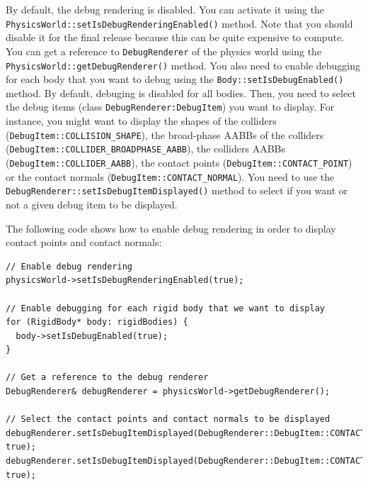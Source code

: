 \documentclass[a4paper,12pt]{article}
\begin{document}
  \begin{sloppypar}
   By default, the debug rendering is disabled. You can activate it using the \texttt{PhysicsWorld::setIsDebugRenderingEnabled()} method. Note that you
   should disable it for the final release because this can be quite expensive to compute. You can get a reference to \texttt{DebugRenderer} of the physics
   world using the \texttt{PhysicsWorld::getDebugRenderer()} method. You also need to enable debugging for each body that you want to debug using the
   \texttt{Body::setIsDebugEnabled()} method. By default,
   debuging is disabled for all bodies. Then, you need to select the debug items
   (class \texttt{DebugRenderer:DebugItem}) you want to display. For instance, you might want to display the shapes of the colliders
   (\texttt{DebugItem::COLLISION\_SHAPE}), the broad-phase AABBs of the colliders (\texttt{DebugItem::COLLIDER\_BROADPHASE\_AABB}), the colliders AABBs
   (\texttt{DebugItem::COLLIDER\_AABB}), the contact points (\texttt{DebugItem::CONTACT\_POINT}) or the contact normals (\texttt{DebugItem::CONTACT\_NORMAL}).
   You need to use the \texttt{DebugRenderer::setIsDebugItemDisplayed()} method to select if you want or not a given debug item to be displayed. \\
  \end{sloppypar}

  The following code shows how to enable debug rendering in order to display contact points and contact normals: \\

    \begin{lstlisting}
// Enable debug rendering
physicsWorld->setIsDebugRenderingEnabled(true);

// Enable debugging for each rigid body that we want to display
for (RigidBody* body: rigidBodies) {
  body->setIsDebugEnabled(true);
}

// Get a reference to the debug renderer
DebugRenderer& debugRenderer = physicsWorld->getDebugRenderer();

// Select the contact points and contact normals to be displayed
debugRenderer.setIsDebugItemDisplayed(DebugRenderer::DebugItem::CONTACT_POINT, true);
debugRenderer.setIsDebugItemDisplayed(DebugRenderer::DebugItem::CONTACT_NORMAL, true);
    \end{lstlisting}

   \vspace{0.6cm}
\end{document}
